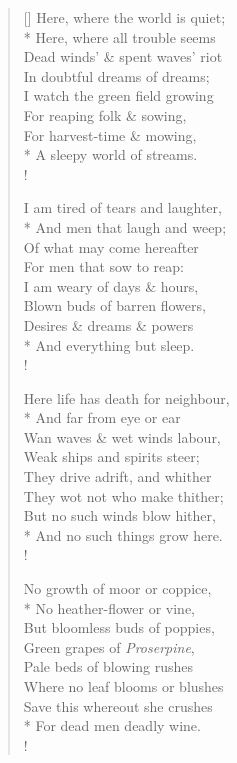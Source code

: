 \documentclass[MAIN]{subfiles}
\begin{document}
\settowidth{\versewidth}{Here, where the world is quiet;}
\begin{verse}[\versewidth]
Here, where the world is quiet;\\* 
\vin Here, where all trouble seems\\
Dead winds' \& spent waves' riot\\
\vin In doubtful dreams of dreams;\\
I watch the green field growing\\
For reaping folk \& sowing,\\
For harvest-time \& mowing,\\* 
\vin A sleepy world of streams.\\!

I am tired of tears and laughter,\\*
\vin And men that laugh and weep;\\
Of what may come hereafter\\
\vin For men that sow to reap:\\
I am weary of days \& hours,\\
Blown buds of barren flowers,\\
Desires \& dreams \& powers\\*
\vin And everything but sleep.\\!

Here life has death for neighbour,\\*
\vin And far from eye or ear\\
Wan waves \& wet winds labour,\\
\vin Weak ships and spirits steer;\\
They drive adrift, and whither\\
They wot not who make thither;\\
But no such winds blow hither,\\*
\vin And no such things grow here.\\!

No growth of moor or coppice,\\*
\vin No heather-flower or vine,\\
But bloomless buds of poppies,\\
\vin Green grapes of \emph{Proserpine},\\
Pale beds of blowing rushes\\
Where no leaf blooms or blushes\\
Save this whereout she crushes\\*
\vin For dead men deadly wine.\\!


\end{verse}
\end{document}
